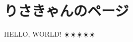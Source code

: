 \chapter{りさきゃんのページ}
\label{chap:chap03-test}
\begin{starterabstract}
HELLO,  WORLD! ☀️☀️☀️☀️☀️
\end{starterabstract}
